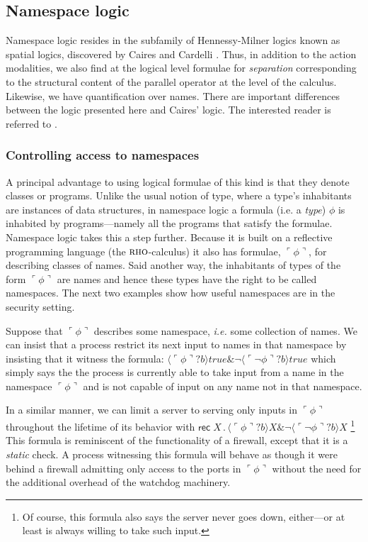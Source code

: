 \documentclass[submission,copyright,creativecommons]{eptcs}
\newcommand{\lpquote}{\ulcorner}
\newcommand{\rpquote}{\urcorner}
\newcommand{\ptrue}{\mathbin{true}}
\newcommand{\pquotep}[1]{\lpquote #1 \rpquote}
\newcommand{\pprefix}[3]{\langle #1 ? #2 \rangle #3}
\newcommand{\pgfp}[2]{\textsf{rec} \; #1 \mathbin{.} #2}
\numberwithin{equation}{subsection}
\newcommand{\rhoc}{${\textsc{rho}}$-calculus}
\begin{document}
\subsection{Namespace logic}
Namespace logic resides in the subfamily of Hennessy-Milner logics
known as spatial logics, discovered by Caires and Cardelli
\cite{DBLP:conf/fossacs/Caires04}. Thus, in addition to the action
modalities, we also find at the logical level formulae for
\emph{separation} corresponding to the structural content of the
parallel operator at the level of the calculus. Likewise, we have
quantification over names. There are important differences between the
logic presented here and Caires' logic. The interested reader is
referred to \cite{DBLP:conf/tgc/MeredithR05}.

\subsubsection{Controlling access to namespaces}
\label{namespace}

A principal advantage to using logical formulae of this kind is that
they denote classes or programs. Unlike the usual notion of type,
where a type's inhabitants are instances of data structures, in
namespace logic a formula (i.e. a \emph{type}) $\phi$ is inhabited by
programs---namely all the programs that satisfy the
formulae. Namespace logic takes this a step further. Because it is
built on a reflective programming language (the \rhoc) it also has
formulae, $\pquotep{\phi}$, for describing classes of names. Said
another way, the inhabitants of types of the form $\pquotep{\phi}$ are
names and hence these types have the right to be called
namespaces. The next two examples show how useful namespaces are in
the security setting.

Suppose that $\pquotep{\phi}$ describes some namespace, {\em i.e.}
some collection of names. We can insist that a process restrict its
next input to names in that namespace by insisting that it witness the
formula: $\pprefix{\pquotep{\phi}}{b}{\ptrue} \& \neg
\pprefix{\pquotep{\neg \phi}}{b}{\ptrue}$ which simply says the the
process is currently able to take input from a name in the namespace
$\pquotep{\phi}$ and is not capable of input on any name not in that
namespace. 

In a similar manner, we can limit a server to serving only inputs in
$\pquotep{\phi}$ throughout the lifetime of its behavior with
$\pgfp{X}{\pprefix{\pquotep{\phi}}{b}{X} \& \neg
  \pprefix{\pquotep{\neg \phi}}{b}{X}} \nonumber$ \footnote{Of course,
  this formula also says the server never goes down, either---or at
  least is always willing to take such input.} This formula is
reminiscent of the functionality of a firewall, except that it is a
\emph{static} check. A process witnessing this formula will behave as
though it were behind a firewall admitting only access to the ports in
$\pquotep{\phi}$ without the need for the additional overhead of the
watchdog machinery.
\end{document}
